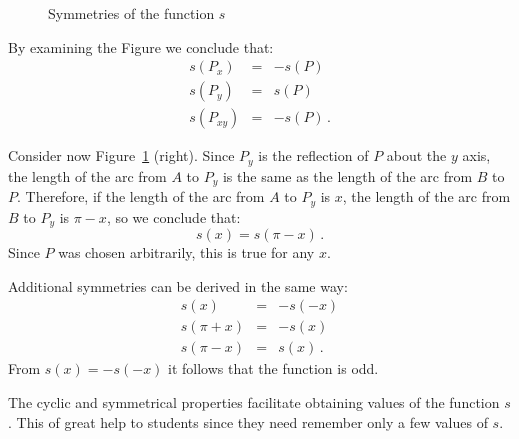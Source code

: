 \begin{figure}[hbt]
\begin{minipage}{.45\textwidth}
\begin{center}
\end{center}
\end{minipage}
\caption{Symmetries of the function $s$}\label{fig.symmetries}
\end{figure}


By examining the Figure we conclude that:
\begin{eqnarray*}
s(P_x) &=& -s(P)\\
s(P_y) &=& s(P)\\
s(P_{xy}) &=& -s(P)\,.
\end{eqnarray*}

Consider now Figure~\ref{fig.symmetries} (right). Since $P_y$ is the reflection of $P$ about the $y$ axis, the length of the arc from $A$ to $P_y$ is the same as the length of the arc from $B$ to $P$. Therefore, if the length of the arc from $A$ to $P_y$ is $x$, the length of the arc from $B$ to $P_y$ is $\pi-x$, so we conclude that:
\[
s(x) = s(\pi - x)\,.
\]
Since $P$ was chosen arbitrarily, this is true for any $x$.

Additional symmetries can be derived in the same way:
\begin{eqnarray*}
s(x) &=& -s(-x)\\
s(\pi+x) &=& -s(x)\\
s(\pi-x) &=& s(x)\,.
\end{eqnarray*}
From $s(x) = -s(-x)$ it follows that the function is odd.

The cyclic and symmetrical properties facilitate obtaining values of the function $s$. This of great help to students since they need remember only a few values of $s$.

\newpage

